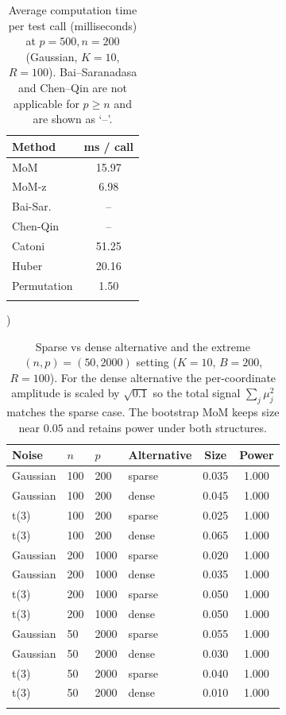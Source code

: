 \documentclass[pdflatex,sn-mathphys-num]{sn-jnl}
\theoremstyle{thmstyleone}%
\theoremstyle{thmstyletwo}%
\theoremstyle{thmstylethree}%
\begin{document}
\begin{table}[t]
\centering\small
\caption{Average computation time per test call (milliseconds) at $p=500, n=200$ (Gaussian, $K=10$, $R=100$). Bai--Saranadasa and Chen--Qin are not applicable for $p\ge n$ and are shown as `--'.}
\label{tab:timing}
\begin{tabular}{lc}
\toprule
Method & ms / call \\
\midrule
MoM & 15.97 \\
MoM-z & 6.98 \\
Bai-Sar. & -- \\
Chen-Qin & -- \\
Catoni & 51.25 \\
Huber & 20.16 \\
Permutation & 1.50 \\
\botrule
\end{tabular}
\end{table}


\begin{table}[t]
\centering\small
\caption{Sparse vs dense alternative and the extreme $(n,p)=(50,2000)$ setting ($K=10$, $B=200$, $R=100$). For the dense alternative the per-coordinate amplitude is scaled by $\sqrt{0.1}$ so the total signal $\sum_j\mu_j^2$ matches the sparse case. The bootstrap MoM keeps size near $0.05$ and retains power under both structures.})
\label{tab:dense}
\begin{tabular}{llllcc}
\toprule
Noise & $n$ & $p$ & Alternative & Size & Power \\
\midrule
Gaussian & 100 & 200 & sparse & 0.035 & 1.000 \\
Gaussian & 100 & 200 & dense & 0.045 & 1.000 \\
t(3) & 100 & 200 & sparse & 0.025 & 1.000 \\
t(3) & 100 & 200 & dense & 0.065 & 1.000 \\
Gaussian & 200 & 1000 & sparse & 0.020 & 1.000 \\
Gaussian & 200 & 1000 & dense & 0.035 & 1.000 \\
t(3) & 200 & 1000 & sparse & 0.050 & 1.000 \\
t(3) & 200 & 1000 & dense & 0.050 & 1.000 \\
Gaussian & 50 & 2000 & sparse & 0.055 & 1.000 \\
Gaussian & 50 & 2000 & dense & 0.030 & 1.000 \\
t(3) & 50 & 2000 & sparse & 0.040 & 1.000 \\
t(3) & 50 & 2000 & dense & 0.010 & 1.000 \\
\botrule
\end{tabular}
\end{table}
\end{document}
